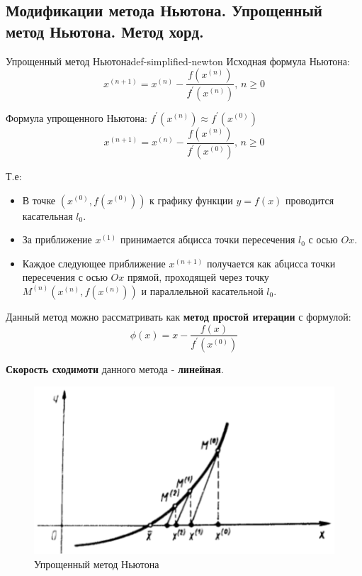 \documentclass[14pt]{extarticle}
\begin{document}
\clearpage
\subsection{Модификации метода Ньютона. Упрощенный метод Ньютона. Метод хорд.}

    \begin{definition}{Упрощенный метод Ньютона}{def-simplified-newton}
        Исходная формула Ньютона:
        $$x^{(n + 1)} = x^{(n)} - \frac{f(x^{(n)})}{f^{'}(x^{(n)})} \text{, } n \geq 0$$

        Формула упрощенного Ньютона: $f^{'}(x^{(n)}) \approx f^{'}(x^{(0)})$
        $$x^{(n + 1)} = x^{(n)} - \frac{f(x^{(n)})}{f^{'}(x^{(0)})} \text{, } n \geq 0$$
   
        Т.е:
        \begin{itemize}
            \item В точке $(x^{(0)}, f(x^{(0)}))$ к графику функции $y = f(x)$ проводится касательная $l_{0}$.
            \item За приближение $x^{(1)}$ принимается абцисса точки пересечения $l_{0}$ с осью $Ox$.
            \item Каждое следующее приближение $x^{(n + 1)}$ получается как абцисса точки пересечения с осью $Ox$ прямой, проходящей через точку $M^{(n)}(x^{(n)}, f(x^{(n)}))$ и параллельной касательной $l_{0}$.
        \end{itemize}

        \vspace{\baselineskip}

        Данный метод можно рассматривать как \textbf{метод простой итерации} с формулой:
        $$\phi(x) = x - \frac{f(x)}{f^{'}(x^{(0)})}$$

        \vspace{\baselineskip}

        \textbf{Скорость сходимоти} данного метода - \textbf{линейная}.
    \end{definition}

    \begin{figure}[H]
        \centering
        \includegraphics[scale=0.5]{images/simplified-newton-ex.png}
        \caption{Упрощенный метод Ньютона}
        \label{fig:simplified-newton-method}
    \end{figure}
\end{document}
